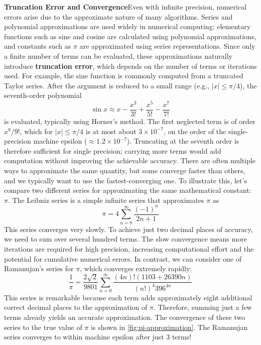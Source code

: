 \textbf{Truncation Error and Convergence}\quad Even with infinite precision, numerical errors arise due to the approximate nature of many algorithms.
Series and polynomial approximations are used widely in numerical computing: elementary functions such as sine and cosine are calculated using polynomial approximations, and constants such as \(\pi\) are approximated using series representations.
Since only a finite number of terms can be evaluated, these approximations naturally introduce \textbf{truncation error}, which depends on the number of terms or iterations used.
For example, the sine function is commonly computed from a truncated Taylor series.
After the argument is reduced to a small range (e.g., $|x| \leq \pi/4$), the seventh-order polynomial
\begin{equation*}
    \sin x \approx x - \frac{x^3}{3!} + \frac{x^5}{5!} - \frac{x^7}{7!}
\end{equation*}
is evaluated, typically using Horner's method.
The first neglected term is of order $x^9/9!$, which for $|x| \leq \pi/4$ is at most about $3 \times 10^{-7}$, on the order of the single-precision machine epsilon ($\approx 1.2 \times 10^{-7}$).
Truncating at the seventh order is therefore sufficient for single precision; carrying more terms would add computation without improving the achievable accuracy.
There are often multiple ways to approximate the same quantity, but some converge faster than others, and we typically want to use the fastest-converging one.
To illustrate this, let's compare two different series for approximating the same mathematical constant: \(\pi\). The Leibniz series is a simple infinite series that approximates \(\pi\) as
\begin{equation*}
\pi = 4 \sum_{n=0}^\infty \frac{(-1)^n}{2n+1}
\end{equation*}
This series converges very slowly. To achieve just two decimal places of accuracy, we need to sum over several hundred terms. The slow convergence means more iterations are required for high precision, increasing computational effort and the potential for cumulative numerical errors. In contrast, we can consider one of Ramanujan's series for \(\pi\), which converges extremely rapidly:
\begin{equation*}
    \frac{1}{\pi} = \frac{2\sqrt{2}}{9801} \sum_{n=0}^\infty \frac{(4n)! (1103 + 26390n)}{(n!)^4 396^{4n}}
\end{equation*}
This series is remarkable because each term adds approximately eight additional correct decimal places to the approximation of \(\pi\). Therefore, summing just a few terms already yields an accurate approximation. The convergence of these two series to the true value of $\pi$ is shown in \autoref{fig:pi-approximation}. The Ramanujan series converges to within machine epsilon after just 3 terms!

